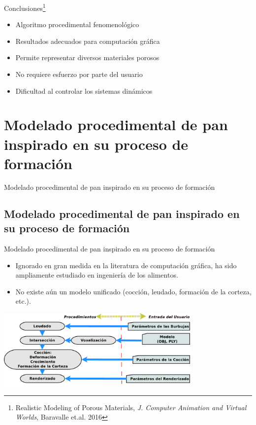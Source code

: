 \documentclass[spanish,unknownkeysallowed,10pt]{beamer}
\begin{document}
\begin{frame}{Conclusiones\footnote{Realistic Modeling of Porous Materials, {\it J. Computer Animation and Virtual Worlds}, Baravalle et.al. 2016}}
\begin{block}{}
\begin{itemize}
\item Algoritmo procedimental fenomenológico
\item Resultados adecuados para computación gráfica
\item Permite representar diversos materiales porosos
\item No requiere esfuerzo por parte del usuario

\item Dificultad al controlar los sistemas dinámicos
\end{itemize}
\end{block}
\end{frame}


\section[Modelado de Pan]{Modelado procedimental de pan inspirado en su proceso de formación}


\begin{frame}
\begin{block}{}
\begin{center}
\vspace{1cm}
\huge{Modelado procedimental de pan inspirado en su proceso de formación}
\vspace{1cm}
\end{center}
\end{block}
\end{frame}

\subsection{Modelado procedimental de pan inspirado en su proceso de formación}
\begin{frame}{Modelado procedimental de pan inspirado en su proceso de formación}
\begin{block}{}
\begin{itemize}
\item Ignorado en gran medida en la literatura de computación gráfica, ha sido ampliamente estudiado en ingeniería de los alimentos.
\item No existe aún un modelo unificado (cocción, leudado, formación de la corteza, etc.).
\end{itemize}
\end{block}

\centerline{\includegraphics[width=10cm]{../figures/pipeline}}
\end{frame}
\end{document}
